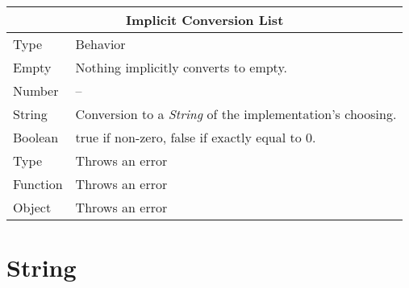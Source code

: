 \documentclass[12pt,letterpaper]{report}
\begin{document}
{
\centering
\begin{tabular}{ |p{2.5cm}||p{10cm}|  }
  \hline
  \multicolumn{2}{|c|}{Implicit Conversion List} \\
  \hline
  Type & Behavior\\
  \hline
  Empty & Nothing implicitly converts to empty.\\
  Number  & -- \\
  String & Conversion to a \textit{String} of the implementation's choosing.\\
  Boolean & true if non-zero, false if exactly equal to 0.\\
  Type & Throws an error\\
  Function & Throws an error\\
  Object & Throws an error\\
 \hline
\end{tabular}
}





\section{String}\label{String}
\end{document}
